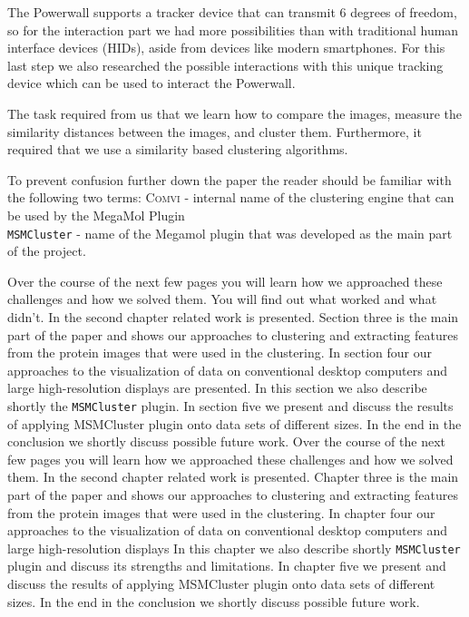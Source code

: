 \documentclass[journal]{vgtc}       %
\begin{document}
The Powerwall supports a tracker device that can transmit 6 degrees of freedom, so for the interaction part we had more possibilities than with traditional human interface  devices  (HIDs), aside from devices like modern smartphones. For this last step we also researched the possible interactions with this unique tracking device  which can be used to interact the Powerwall.

The task required from us that we learn how to compare the images, measure the similarity  distances between the images, and cluster them. Furthermore, it  required that we use a similarity based clustering algorithms.


To prevent confusion further down the paper  the reader should be familiar with the following two terms: \textsc{Comvi} - internal name of the clustering engine that can be used by the MegaMol Plugin \\
\verb|MSMCluster| - name of the Megamol plugin that was developed as the main part of the project.

Over the course of the next few pages you will learn how we approached these challenges and how we  solved them. You will find out what  worked and what didn't. In the second chapter related work is presented. Section three is the main part of the paper and shows our approaches to clustering and extracting features from the protein images that were used in the clustering. In section four our approaches to the visualization of data on conventional desktop computers and large high-resolution displays are presented. In this section we also describe shortly the \verb|MSMCluster| plugin. In section five we present and discuss the results of applying MSMCluster plugin onto data sets of different sizes. In the end in the conclusion we shortly discuss possible future work.
Over the course of the next few pages you will learn how we approached these challenges and how we  solved them. In the second chapter related work is presented. Chapter three is the main part of the paper and shows our approaches to clustering and extracting features from the protein images that were used in the clustering. In chapter four our approaches to the visualization of data on conventional desktop computers and large high-resolution displays In this chapter we also describe shortly \verb|MSMCluster| plugin and discuss its strengths and limitations. In chapter five we present and discuss the results of applying MSMCluster plugin onto data sets of different sizes. In the end in the conclusion we shortly discuss possible future work.
\end{document}
